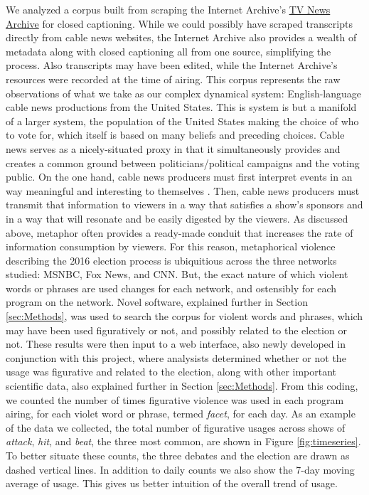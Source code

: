 We analyzed a corpus built from scraping the Internet Archive's 
\href{http://archive.org/tv/details}{TV News Archive} for closed captioning.
While we could possibly have scraped transcripts directly from cable news
websites, the Internet Archive also provides a wealth of metadata along with
closed captioning all from one source, simplifying the process. Also transcripts
may have been edited, while the Internet Archive's resources were recorded
at the time of airing. This corpus represents the raw observations of what we
take as our complex dynamical system: English-language cable news productions
from the United States. This is system is but a manifold of a larger system,
the population of the United States making the choice of who to vote for, which
itself is based on many beliefs and preceding choices. Cable news serves as
a nicely-situated proxy in that it simultaneously provides and creates
a common ground between politicians/political campaigns and the voting public.
On the one hand, cable news producers must first 
interpret events in an way meaningful and interesting to themselves \cite{Clark1996}. 
Then, cable news producers must transmit that information to viewers in a
way that satisfies a show's sponsors and in a way that will resonate and
be easily digested by the viewers. As discussed above, metaphor often provides
a ready-made conduit that increases the rate of information consumption by
viewers. For this reason, metaphorical violence describing the 2016 election
process is ubiquitious across the three networks studied: MSNBC, Fox News, and
CNN. But, the exact nature of which violent words or phrases are used changes
for each network, and ostensibly for each program on the network. Novel 
software, explained further in Section \ref{sec:Methods}, 
was used to search the corpus for violent words and phrases, which may have been
used figuratively or not, and possibly related to the election or not.
These results were then input to a web interface, also newly developed in 
conjunction with this project, where analysists determined whether or not the
usage was figurative and related to the election, along with other important
scientific data, also explained further in Section \ref{sec:Methods}. 
From this coding, we counted the number of times figurative violence was 
used in each program airing, for each violet word or phrase, termed 
\textit{facet}, for each day. As an example of the data we collected, the 
total number of figurative usages across shows of \textit{attack}, \textit{hit}, and
\textit{beat}, the three most common, are shown in Figure \ref{fig:timeseries}. 
To better situate these counts, the three debates and the election are drawn
as dashed vertical lines. In addition to daily counts we also show the 7-day
moving average of usage. This gives us better intuition of the overall trend
of usage.

